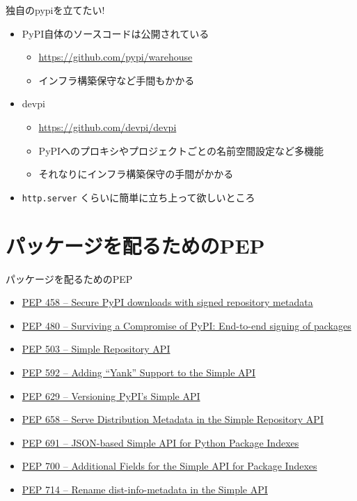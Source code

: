 \documentclass[presentation]{beamer}
\begin{document}
\begin{frame}[label={sec:org028b384},fragile]{独自のpypiを立てたい!}
 \begin{itemize}
\item PyPI自体のソースコードは公開されている
\begin{itemize}
\item \url{https://github.com/pypi/warehouse}
\item インフラ構築保守など手間もかかる
\end{itemize}
\item devpi
\begin{itemize}
\item \url{https://github.com/devpi/devpi}
\item PyPIへのプロキシやプロジェクトごとの名前空間設定など多機能
\item それなりにインフラ構築保守の手間がかかる
\end{itemize}
\item \texttt{http.server} くらいに簡単に立ち上って欲しいところ
\end{itemize}
\end{frame}

\section{パッケージを配るためのPEP}
\label{sec:org07f6a7c}
\begin{frame}[label={sec:org36d844a}]{パッケージを配るためのPEP}
\begin{itemize}
\item \href{https://peps.python.org/pep-0458}{PEP 458 – Secure PyPI downloads with signed repository metadata}
\item \href{https://peps.python.org/pep-0480}{PEP 480 – Surviving a Compromise of PyPI: End-to-end signing of packages}
\item \href{https://peps.python.org/pep-0503/}{PEP 503 – Simple Repository API}
\item \href{https://peps.python.org/pep-0592}{PEP 592 – Adding “Yank” Support to the Simple API}
\item \href{https://peps.python.org/pep-0629}{PEP 629 – Versioning PyPI’s Simple API}
\item \href{https://peps.python.org/pep-0658}{PEP 658 – Serve Distribution Metadata in the Simple Repository API}
\item \href{https://peps.python.org/pep-0691}{PEP 691 – JSON-based Simple API for Python Package Indexes}
\item \href{https://peps.python.org/pep-0700}{PEP 700 – Additional Fields for the Simple API for Package Indexes}
\item \href{https://peps.python.org/pep-0714}{PEP 714 – Rename dist-info-metadata in the Simple API}
\end{itemize}
\end{frame}
\end{document}
